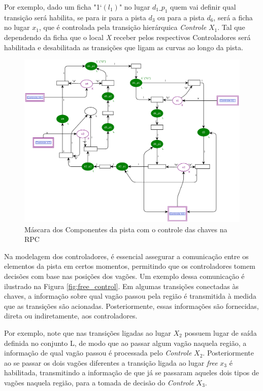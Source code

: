 Por exemplo, dado um ficha "1`$(l_1)$" no lugar $d_1\_p_1$ quem vai definir qual transição será habilita, se para ir para a pista $d_3$ ou para a pista $d_6$, será a ficha no lugar $x_1$, que é controlada pela transição hierárquica \textit{Controle} $X_1$. Tal que dependendo da ficha que o local \textit{X} receber pelos respectivos Controladores será habilitada e desabilitada as transições que ligam as curvas ao longo da pista. 
\begin{figure}[ht]
    \centering
    \caption{Máscara dos Componentes da pista com o controle das chaves na RPC}
    \label{fig:pista_chaves_RPC}
    \includegraphics[width=1\linewidth]{figures//Simulation//Modelagem/pista_com_chaves.eps}
\end{figure}

Na modelagem dos controladores, é essencial assegurar a comunicação entre os elementos da pista em certos momentos, permitindo que os controladores tomem decisões com base nas posições dos vagões. Um exemplo dessa comunicação é ilustrado na Figura \ref{fig:free_control}. Em algumas transições conectadas às chaves, a informação sobre qual vagão passou pela região é transmitida à medida que as transições são acionadas. Posteriormente, essas informações são fornecidas, direta ou indiretamente, aos controladores.

Por exemplo, note que nas transições ligadas ao lugar $X_2$ possuem lugar de saída definida no conjunto L, de modo que ao passar algum vagão naquela região, a informação de qual vagão passou é processada pelo \textit{Controle} $X_2$. Posteriormente ao se passar os dois vagões diferentes a transição ligada ao lugar \textit{free} $x_3$ é habilitada, transmitindo a informação de que já se passaram aqueles dois tipos de vagões naquela região, para a tomada de decisão do \textit{Controle} $X_3$.

